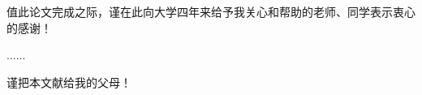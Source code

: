 \begin{thanks}
值此论文完成之际，谨在此向大学四年来给予我关心和帮助的老师、同学表示衷心的感谢！

......

\vskip 18pt

谨把本文献给我的父母！

\end{thanks}
